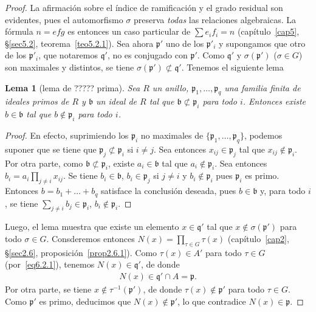 \documentclass[10pt,oneside,bibtotoc,smallheadings,leqno,a5paper,DIV=12]{scrbook}
\newcommand{\idl}[1]{\mathfrak{#1}}
\newcommand{\QED}{}%
\numberwithin{equation}{section}
\theoremstyle{defi}
\theoremstyle{enonce}
\newtheorem{lemma}{Lema}
\theoremstyle{rem}
\numberwithin{theorem}{section}
\numberwithin{proposition}{section}
\numberwithin{definition}{section}
\numberwithin{lemma}{section}
\numberwithin{corollary}{section}
\numberwithin{example}{section}
\numberwithin{footnote}{section}%
\begin{document}
\begin{proof}
La afirmaci\'on sobre el \'indice de ramificaci\'on y el grado residual son evidentes, pues el automorfismo
$\sigma$ preserva {\em todas} las relaciones algebraicas. La f\'ormula $n=efg$ es entonces un caso particular
de $\sum e_{i}f_{i}=n$ (cap\'itulo~\ref{cap5}, \S\ref{sec5.2}, teorema~\ref{teo5.2.1}). Sea ahora $\idl{p}'$ uno de los $\idl{p}'_{i}$
y supongamos que otro de los $\idl{p}'_{i}$, que notaremos $\idl{q}'$, no es conjugado con $\idl{p}'$.
Como $\idl{q}'$ y $\sigma(\idl{p}')$ ($\sigma\in G$) son maximales y distintos, se tiene $\sigma(\idl{p}')\not\subset\idl{q}'$.
Tenemos el siguiente lema

\begin{lemma}[lema de ????? prima]
Sea $R$ un anillo, $\idl{p}_{1},\dots,\idl{p}_{q}$ una familia finita de ideales primos de $R$ y $\idl{b}$
un ideal de $R$ tal que $\idl{b}\not\subset\idl{p}_{i}$ para todo $i$. Entonces existe $b\in\idl{b}$ tal que
$b\notin\idl{p}_{i}$ para todo $i$.
\end{lemma}

\begin{proof}
En efecto, suprimiendo los $\idl{p}_{i}$ no maximales de
$\{\idl{p}_{1},\dots,\idl{p}_{q}\}$, podemos suponer
que se tiene que $\idl{p}_{j}\not\subset\idl{p}_{i}$ si $i\neq j$. Sea entonces
$x_{ij}\in\idl{p}_{j}$ tal que
$x_{ij}\notin\idl{p}_{i}$. Por otra parte, como $\idl{b}\not\subset\idl{p}_{i}$, existe
$a_{i}\in\idl{b}$
tal que $a_{i}\notin\idl{p}_{i}$. Sea entonces $b_{i} = a_{i}\prod_{j\neq i}x_{ij}$. Se tiene
$b_{i}\in\idl{b}$, $b_{i}\in\idl{p}_{j}$ si $j\neq i$ y $b_{i}\notin\idl{p}_{i}$ pues
$\idl{p}_{i}$ es primo.
Entonces $b=b_{1}+\dots+b_{q}$ satisface la conclusi\'on deseada, pues $b\in\idl{b}$ y,
para todo $i$, se tiene
$\sum_{j\neq i}b_{j}\in\idl{p}_{i}$, $b_{i}\notin\idl{p}_{i}$. \QED
\end{proof}

Luego, el lema muestra que existe un elemento $x\in\idl{q}'$ tal que $x\notin\sigma(\idl{p}')$ para todo
$\sigma\in G$. Consderemos entonces $N(x) = \prod_{\tau\in G}\tau(x)$ (cap\'itulo~\ref{cap2}, \S\ref{sec2.6},
proposici\'on~\ref{prop2.6.1}).
Como $\tau(x)\in A'$ para todo $\tau\in G$ (por~\eqref{eq6.2.1}),
tenemos $N(x)\in\idl{q}'$, de donde
\begin{gather*}
N(x) \in \idl{q}'\cap A = \idl{p}.
\end{gather*}
Por otra parte, se tiene $x\notin\tau^{-1}(\idl{p}')$, de donde $\tau(x)\notin\idl{p}'$
para todo
$\tau\in G$. Como $\idl{p}'$ es primo, deducimos que $N(x)\notin\idl{p}'$, lo que
contradice $N(x)\in\idl{p}$. \QED
\end{proof}
\end{document}
